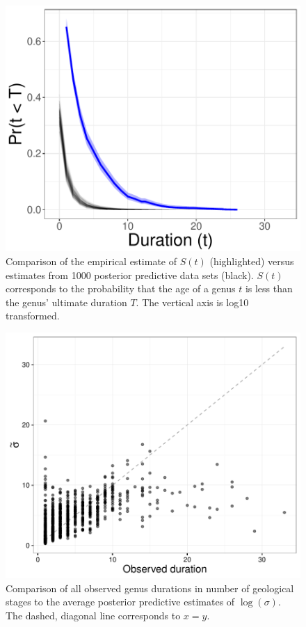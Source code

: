 \documentclass{article}
\begin{document}
\clearpage


\begin{figure}[ht]
  \centering
  \includegraphics[height = 0.5\textheight,width=\textwidth,keepaspectratio=true]{figure/survival_curves}
  \caption{Comparison of the empirical estimate of \(S(t)\) (highlighted) versus estimates from 1000 posterior predictive data sets (black). \(S(t)\) corresponds to the probability that the age of a genus \(t\) is less than the genus' ultimate duration \(T\). The vertical axis is log10 transformed.}
  \label{fig:surv}
\end{figure}


\begin{figure}[ht]
  \centering
  \includegraphics[height = 0.5\textheight,width=\textwidth,keepaspectratio=true]{figure/shotgun}
  \caption{Comparison of all observed genus durations in number of geological stages to the average posterior predictive estimates of \(\log(\sigma)\). The dashed, diagonal line corresponds to \(x = y\).}
  \label{fig:shot}
\end{figure}
\end{document}
